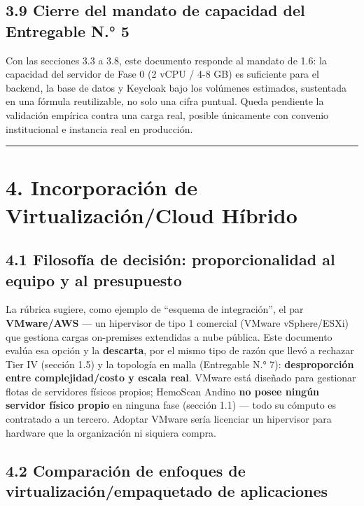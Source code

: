 \documentclass[11pt,a4paper]{article}
\begin{document}
\subsection{3.9 Cierre del mandato de capacidad del Entregable N.° 5}\label{cierre-del-mandato-de-capacidad-del-entregable-n.-5}

Con las secciones 3.3 a 3.8, este documento responde al mandato de 1.6: la capacidad del servidor de Fase 0 (2 vCPU / 4-8 GB) es suficiente para el backend, la base de datos y Keycloak bajo los volúmenes estimados, sustentada en una fórmula reutilizable, no solo una cifra puntual. Queda pendiente la validación empírica contra una carga real, posible únicamente con convenio institucional e instancia real en producción.

\begin{center}\rule{0.5\linewidth}{0.5pt}\end{center}

\section{4. Incorporación de Virtualización/Cloud Híbrido}\label{incorporaciuxf3n-de-virtualizaciuxf3ncloud-huxedbrido}

\subsection{4.1 Filosofía de decisión: proporcionalidad al equipo y al presupuesto}\label{filosofuxeda-de-decisiuxf3n-proporcionalidad-al-equipo-y-al-presupuesto}

La rúbrica sugiere, como ejemplo de ``esquema de integración'', el par \textbf{VMware/AWS} --- un hipervisor de tipo 1 comercial (VMware vSphere/ESXi) que gestiona cargas on-premises extendidas a nube pública. Este documento evalúa esa opción y la \textbf{descarta}, por el mismo tipo de razón que llevó a rechazar Tier IV (sección 1.5) y la topología en malla (Entregable N.° 7): \textbf{desproporción entre complejidad/costo y escala real}. VMware está diseñado para gestionar flotas de servidores físicos propios; HemoScan Andino \textbf{no posee ningún servidor físico propio} en ninguna fase (sección 1.1) --- todo su cómputo es contratado a un tercero. Adoptar VMware sería licenciar un hipervisor para hardware que la organización ni siquiera compra.

\subsection{4.2 Comparación de enfoques de virtualización/empaquetado de aplicaciones}\label{comparaciuxf3n-de-enfoques-de-virtualizaciuxf3nempaquetado-de-aplicaciones}
\end{document}
